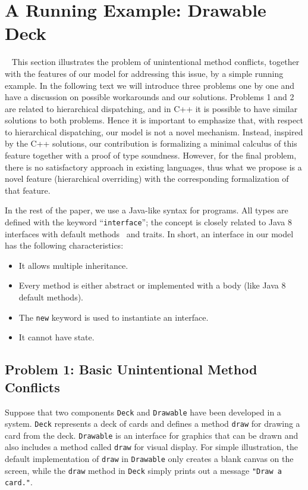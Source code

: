\section{A Running Example: Drawable Deck}~\label{sec:overview}
This section illustrates the problem of unintentional method conflicts,
together with the features of our model for addressing this issue, by
a simple running example. In the following text we will introduce three
problems one by one and have a discussion on possible workarounds and
our solutions.
Problems 1 and 2 are related to hierarchical dispatching, and in 
C++ it is possible to have similar solutions to both
problems. Hence it is important to emphasize that, with respect to
hierarchical dispatching, our model is not a novel
mechanism. Instead, 
inspired by the C++ solutions, our contribution is formalizing a minimal calculus
of this feature together with a proof of type soundness. However, for the final problem, there is no satisfactory approach
in existing languages, thus what we propose is a novel feature (hierarchical
overriding) with the corresponding formalization of that feature.

In the rest of the paper, we use a Java-like syntax for programs. All types are defined with the keyword
``\lstinline|interface|''; the concept is closely related to Java 8
interfaces with default methods~\cite{bono14} and traits. In short, 
an interface in our model has the following characteristics:
\begin{itemize}
	\item It allows multiple inheritance.
	\item Every method is either abstract or implemented with a body (like Java 8 default methods). 
	\item The \lstinline|new| keyword is used to instantiate an interface.
	\item It cannot have state.
\end{itemize}


\subsection{Problem 1: Basic Unintentional Method Conflicts}\label{subsec:problem1}
Suppose that two components \lstinline|Deck| and \lstinline|Drawable| 
have been developed in a system. \lstinline|Deck| represents a deck
of cards and defines a method \lstinline|draw| for drawing a card from the
deck.  \lstinline|Drawable| is an interface for graphics that
can be drawn and also includes a method called \lstinline|draw| for
visual display. For simple illustration, the default implementation of
\lstinline|draw| in \lstinline|Drawable| only creates a blank canvas
on the screen, while the \lstinline|draw| method in \lstinline|Deck| simply
prints out a message \lstinline|"Draw a card."|.


